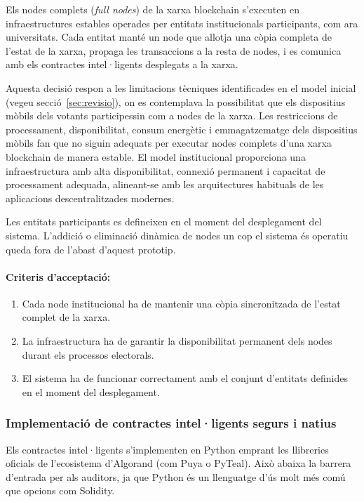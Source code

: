 Els nodes complets (\textit{full nodes}) de la xarxa blockchain s'executen en infraestructures estables operades per entitats institucionals participants, com ara universitats. Cada entitat manté un node que allotja una còpia completa de l'estat de la xarxa, propaga les transaccions a la resta de nodes, i es comunica amb els contractes intel·ligents desplegats a la xarxa.

Aquesta decisió respon a les limitacions tècniques identificades en el model inicial (vegeu secció~\ref{sec:revisio}), on es contemplava la possibilitat que els dispositius mòbils dels votants participessin com a nodes de la xarxa. Les restriccions de processament, disponibilitat, consum energètic i emmagatzematge dels dispositius mòbils fan que no siguin adequats per executar nodes complets d'una xarxa blockchain de manera estable. El model institucional proporciona una infraestructura amb alta disponibilitat, connexió permanent i capacitat de processament adequada, alineant-se amb les arquitectures habituals de les aplicacions descentralitzades modernes.

Les entitats participants es defineixen en el moment del desplegament del sistema. L'addició o eliminació dinàmica de nodes un cop el sistema és operatiu queda fora de l'abast d'aquest prototip.

\paragraph{Criteris d'acceptació:}
\begin{enumerate}[label=\roman*.]
    \item Cada node institucional ha de mantenir una còpia sincronitzada de l'estat complet de la xarxa.
    \item La infraestructura ha de garantir la disponibilitat permanent dels nodes durant els processos electorals.
    \item El sistema ha de funcionar correctament amb el conjunt d'entitats definides en el moment del desplegament.
\end{enumerate}

\subsubsection{Implementació de contractes intel·ligents segurs i natius}

Els contractes intel·ligents s'implementen en Python emprant les llibreries oficials de l'ecosistema d'Algorand (com Puya o PyTeal).
Això abaixa la barrera d'entrada per als auditors, ja que Python és un llenguatge d'ús molt més comú que opcions com Solidity.

